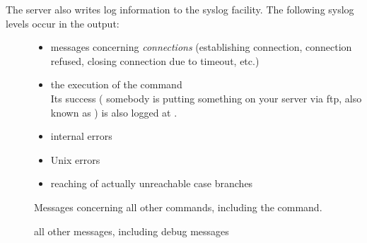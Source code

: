 The server also writes log information to the syslog facility.
The following syslog levels occur in the output:
\begin{description}
\item[]
\begin{itemize}
\item messages concerning \emph{connections} (establishing connection,
  connection refused, closing connection due to timeout, etc.)
\item the execution of the  command\\
  Its success (\ie
  somebody is putting something on your server via ftp, also known as
  ) is also logged at .
\item internal errors
\item Unix errors
\item reaching of actually unreachable case branches
\end{itemize}
\item[] Messages concerning all other commands,
  including the  command.
\item[] all other messages, including debug messages
\end{description}


